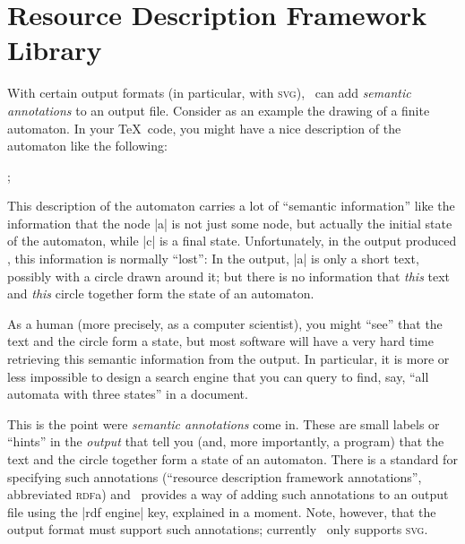 %
%
%


\section[library-rdf]{Resource Description Framework Library}
\label{section-library-rdf}
\label{section-tikz-rdf}

With  certain output
formats (in particular, with \textsc{svg}), \tikzname\ can add \emph{semantic
annotations} to an output file. Consider as an example the drawing of a finite
automaton. In your \TeX\ code, you might have a nice description of the
automaton like the following:
%
\begin{codeexample}
\tikz[automaton] ;
\end{codeexample}
%
This description of the automaton carries a lot of ``semantic information''
like the information that the node |a| is not just some node, but actually the
initial state of the automaton, while |c| is a final state. Unfortunately, in
the output produced \tikzname, this information is normally ``lost'': In the
output, |a| is only a short text, possibly with a circle drawn around it; but
there is no information that \emph{this} text and \emph{this} circle together
form the state of an automaton.

As a human (more precisely, as a computer scientist), you might ``see'' that
the text and the circle form a state, but most software will have a very hard
time retrieving this semantic information from the output. In particular, it is
more or less impossible to design a search engine that you can query to find,
say, ``all automata with three states'' in a document.

This is the point were \emph{semantic annotations} come in. These are small
labels or ``hints'' in the \emph{output} that tell you (and, more importantly,
a program) that the text and the circle together form a state of an automaton.
There is a standard for specifying such annotations (``resource description
framework annotations'', abbreviated \textsc{rdf}a) and \tikzname\ provides a
way of adding such annotations to an output file using the |rdf engine| key,
explained in a moment. Note, however, that the output format must support such
annotations; currently \tikzname\ only supports \textsc{svg}.


